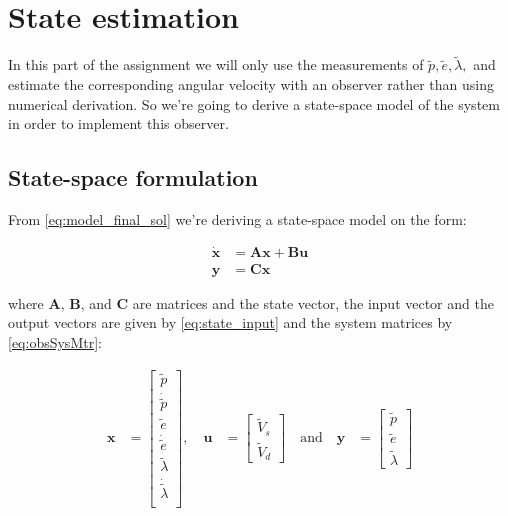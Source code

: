 \section{State estimation}\label{sec:part4}

In this part of the assignment we will only use the measurements of $\tilde{p}, \tilde{e}, \tilde{\lambda},$ and estimate the corresponding angular velocity with an observer rather than using numerical derivation. So we're going to derive a state-space model of the system in order to implement this observer.

\subsection{State-space formulation}

From \cref{eq:model_final_sol} we're deriving a state-space model on the form: 

\begin{equation}
    \begin{aligned}
        \mathbf{\dot{x}} &= \mathbf{Ax + Bu} \\
        \mathbf{y} &= \mathbf{Cx}
    \end{aligned}
\end{equation}

where \textbf{A}, \textbf{B}, and \textbf{C} are matrices and the state vector, the input vector and the output vectors are given by \cref{eq:state_input} and the system matrices by \cref{eq:obsSysMtr}:

\begin{equation}\label{eq:state_input}
    \begin{aligned}
        \mathbf{x} &= \begin{bmatrix} \tilde{p} \\ \dot{\tilde{p}} \\ \tilde{e} \\ \dot{\tilde{e}} \\ \tilde{\lambda} \\ \dot{\tilde{\lambda}} \\ \end{bmatrix} , \quad
        \mathbf{u} &= \begin{bmatrix} \tilde{V}_s \\ \tilde{V}_d \end{bmatrix}
        \quad \textrm{and} \quad
        \mathbf{y} &=  \begin{bmatrix} \tilde{p} \\ \tilde{e} \\ \tilde{\lambda} \end{bmatrix}
    \end{aligned}
\end{equation}

